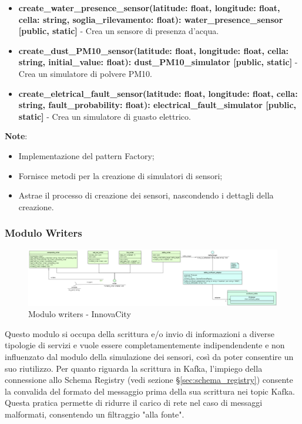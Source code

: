\begin{itemize}
\begin{itemize}
\begin{itemize}
            \item \textbf{create\_water\_presence\_sensor(latitude: float, longitude: float, cella: string, soglia\_rilevamento: float): water\_presence\_sensor [public, static]} - Crea un sensore di presenza d'acqua.
            
            \item \textbf{create\_dust\_PM10\_sensor(latitude: float, longitude: float, cella: string, initial\_value: float): dust\_PM10\_simulator [public, static]} - Crea un simulatore di polvere PM10.
            
            \item \textbf{create\_eletrical\_fault\_sensor(latitude: float, longitude: float, cella: string, fault\_probability: float): electrical\_fault\_simulator [public, static]} - Crea un simulatore di guasto elettrico.
        \end{itemize}
    \textbf{Note}:
        \begin{itemize}
            \item Implementazione del pattern Factory;
            \item Fornisce metodi per la creazione di simulatori di sensori;
            \item Astrae il processo di creazione dei sensori, nascondendo i dettagli della creazione.
        \end{itemize}
    \end{itemize}
\end{itemize}

\subsubsection{Modulo Writers} \label{sec:writersModule}

\begin{figure}[H]
    \centering
    \includegraphics[width=1.1\textwidth]{../Images/SpecificaTecnica/writerModule.PNG}
    \caption{Modulo writers - InnovaCity}
    \label{fig: writersModule}
\end{figure}

Questo modulo si occupa della scrittura e/o invio di informazioni a diverse tipologie di servizi e vuole essere completamentemente indipendendente e non influenzato dal modulo della simulazione dei sensori, così da poter consentire un suo riutilizzo.
Per quanto riguarda la scrittura in Kafka, l'impiego della connessione allo Schema Registry (vedi sezione \S\ref{sec:schema_registry}) consente la convalida del formato del messaggio prima della sua scrittura nei topic Kafka. Questa pratica permette di ridurre il carico di rete nel caso di messaggi malformati, consentendo un filtraggio "alla fonte".


